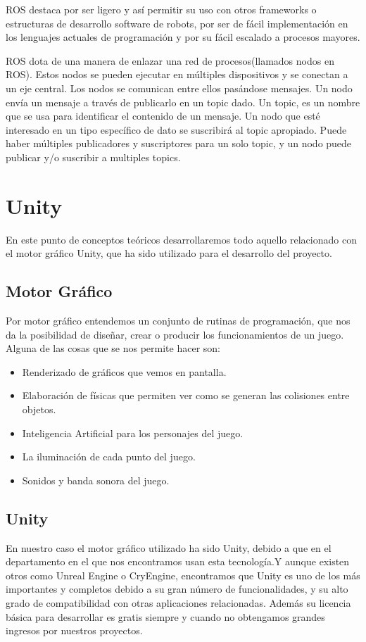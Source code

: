 ROS destaca por ser ligero y así permitir su uso con otros frameworks o estructuras de desarrollo software de robots, por ser de fácil implementación en los lenguajes actuales de programación y por su fácil escalado a procesos mayores.

ROS dota de una manera de enlazar una red de procesos(llamados nodos en ROS). Estos nodos se pueden ejecutar en múltiples dispositivos y se conectan a un eje central. Los nodos se comunican entre ellos pasándose mensajes. Un nodo envía un mensaje a través de publicarlo en un topic dado. Un topic, es un nombre que se usa para identificar el contenido de un mensaje. Un nodo que esté interesado en un tipo específico de dato se suscribirá al topic apropiado. Puede haber múltiples publicadores y suscriptores para un solo topic, y un nodo puede publicar y/o suscribir a multiples topics.

\newpage

\section{Unity}
En este punto de conceptos teóricos desarrollaremos todo aquello relacionado con el motor gráfico Unity, que ha sido utilizado para el desarrollo del proyecto.

\subsection{Motor Gráfico}
Por motor gráfico\cite{MotorGrafico} entendemos un conjunto de rutinas de programación, que nos da la posibilidad de diseñar, crear o producir los funcionamientos de un juego. Alguna de las cosas que se nos permite hacer son:
\begin{itemize}
    \item Renderizado de gráficos que vemos en pantalla.
    \item Elaboración de físicas que permiten ver como se generan las colisiones entre objetos.
    \item Inteligencia Artificial para los personajes del juego.
    \item La iluminación de cada punto del juego.
    \item Sonidos y banda sonora del juego.
\end{itemize}

\subsection{Unity}
En nuestro caso el motor gráfico utilizado ha sido Unity, debido a que en el departamento en el que nos encontramos usan esta tecnología.Y aunque existen otros como Unreal Engine o CryEngine, encontramos que Unity es uno de los más importantes y completos debido a su gran número de funcionalidades, y su alto grado de compatibilidad con otras aplicaciones relacionadas. Además su licencia básica para desarrollar es gratis siempre y cuando no obtengamos grandes ingresos por nuestros proyectos.


